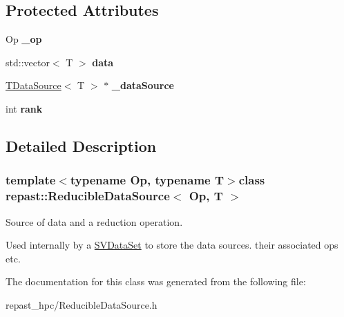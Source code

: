 \subsection*{Protected Attributes}
\begin{DoxyCompactItemize}
\item 
\hypertarget{classrepast_1_1_reducible_data_source_a26e1f75855e72a423dd5cb362f992535}{Op {\bfseries \-\_\-op}}\label{classrepast_1_1_reducible_data_source_a26e1f75855e72a423dd5cb362f992535}

\item 
\hypertarget{classrepast_1_1_reducible_data_source_ad83152c79acdf6db218591c1984af1f2}{std\-::vector$<$ T $>$ {\bfseries data}}\label{classrepast_1_1_reducible_data_source_ad83152c79acdf6db218591c1984af1f2}

\item 
\hypertarget{classrepast_1_1_reducible_data_source_a09765379b1cfb5704ec642e51aebbd74}{\hyperlink{classrepast_1_1_t_data_source}{T\-Data\-Source}$<$ T $>$ $\ast$ {\bfseries \-\_\-data\-Source}}\label{classrepast_1_1_reducible_data_source_a09765379b1cfb5704ec642e51aebbd74}

\item 
\hypertarget{classrepast_1_1_reducible_data_source_a8511ef8c34d008f18e555f17c843596e}{int {\bfseries rank}}\label{classrepast_1_1_reducible_data_source_a8511ef8c34d008f18e555f17c843596e}

\end{DoxyCompactItemize}


\subsection{Detailed Description}
\subsubsection*{template$<$typename Op, typename T$>$class repast\-::\-Reducible\-Data\-Source$<$ Op, T $>$}

Source of data and a reduction operation. 

Used internally by a \hyperlink{classrepast_1_1_s_v_data_set}{S\-V\-Data\-Set} to store the data sources. their associated ops etc. 

The documentation for this class was generated from the following file\-:\begin{DoxyCompactItemize}
\item 
repast\-\_\-hpc/Reducible\-Data\-Source.\-h\end{DoxyCompactItemize}
